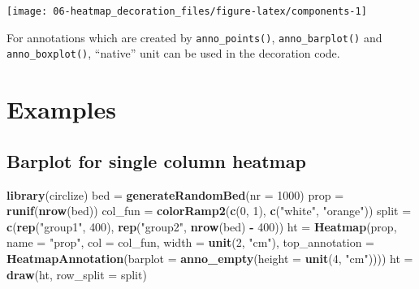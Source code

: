 \documentclass[]{book}
\newenvironment{Shaded}{\begin{snugshade}}{\end{snugshade}}
\newcommand{\KeywordTok}[1]{\textcolor[rgb]{0.13,0.29,0.53}{\textbf{#1}}}
\newcommand{\DataTypeTok}[1]{\textcolor[rgb]{0.13,0.29,0.53}{#1}}
\newcommand{\DecValTok}[1]{\textcolor[rgb]{0.00,0.00,0.81}{#1}}
\newcommand{\StringTok}[1]{\textcolor[rgb]{0.31,0.60,0.02}{#1}}
\newcommand{\OperatorTok}[1]{\textcolor[rgb]{0.81,0.36,0.00}{\textbf{#1}}}
\newcommand{\NormalTok}[1]{#1}
\theoremstyle{definition}
\theoremstyle{definition}
\theoremstyle{definition}
\theoremstyle{remark}
\begin{document}
\begin{center}\texttt{[image: 06-heatmap\_decoration\_files/figure-latex/components-1]} \end{center}

For annotations which are created by \texttt{anno\_points()},
\texttt{anno\_barplot()} and \texttt{anno\_boxplot()}, ``native'' unit
can be used in the decoration code.

\section{Examples}\label{examples}

\subsection{Barplot for single column
heatmap}\label{barplot-for-single-column-heatmap}

\begin{Shaded}
\begin{Highlighting}[]
\KeywordTok{library}\NormalTok{(circlize)}
\NormalTok{bed =}\StringTok{ }\KeywordTok{generateRandomBed}\NormalTok{(}\DataTypeTok{nr =} \DecValTok{1000}\NormalTok{)}
\NormalTok{prop =}\StringTok{ }\KeywordTok{runif}\NormalTok{(}\KeywordTok{nrow}\NormalTok{(bed))}
\NormalTok{col_fun =}\StringTok{ }\KeywordTok{colorRamp2}\NormalTok{(}\KeywordTok{c}\NormalTok{(}\DecValTok{0}\NormalTok{, }\DecValTok{1}\NormalTok{), }\KeywordTok{c}\NormalTok{(}\StringTok{"white"}\NormalTok{, }\StringTok{"orange"}\NormalTok{))}
\NormalTok{split =}\StringTok{ }\KeywordTok{c}\NormalTok{(}\KeywordTok{rep}\NormalTok{(}\StringTok{"group1"}\NormalTok{, }\DecValTok{400}\NormalTok{), }\KeywordTok{rep}\NormalTok{(}\StringTok{"group2"}\NormalTok{, }\KeywordTok{nrow}\NormalTok{(bed) }\OperatorTok{-}\StringTok{ }\DecValTok{400}\NormalTok{))}
\NormalTok{ht =}\StringTok{ }\KeywordTok{Heatmap}\NormalTok{(prop, }\DataTypeTok{name =} \StringTok{"prop"}\NormalTok{, }\DataTypeTok{col =}\NormalTok{ col_fun, }\DataTypeTok{width =} \KeywordTok{unit}\NormalTok{(}\DecValTok{2}\NormalTok{, }\StringTok{"cm"}\NormalTok{),}
    \DataTypeTok{top_annotation =} \KeywordTok{HeatmapAnnotation}\NormalTok{(}\DataTypeTok{barplot =} \KeywordTok{anno_empty}\NormalTok{(}\DataTypeTok{height =} \KeywordTok{unit}\NormalTok{(}\DecValTok{4}\NormalTok{, }\StringTok{"cm"}\NormalTok{))))}
\NormalTok{ht =}\StringTok{ }\KeywordTok{draw}\NormalTok{(ht, }\DataTypeTok{row_split =}\NormalTok{ split)}
\end{Highlighting}
\end{Shaded}
\end{document}
